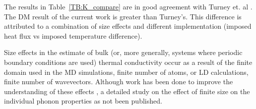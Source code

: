 The results in Table~\ref{TB:K_compare} are in good agreement with Turney et. al \cite{PhysRevB.79.064301}. The DM result of the current work is greater than Turney's. This difference is attributed to a combination of size effects and different implementation (imposed heat flux vs imposed temperature difference).
 
Size effects in the estimate of bulk (or, more generally, systems where periodic boundary conditions are used) thermal conductivity occur as a result of the finite domain used in the MD simulations, finite number of atoms, or LD calculations, finite number of wavevectors. Although work has been done to improve the understanding of these effects \cite{PhysRevB.81.214305}, a detailed study on the effect of finite size on the individual phonon properties as not been published.

